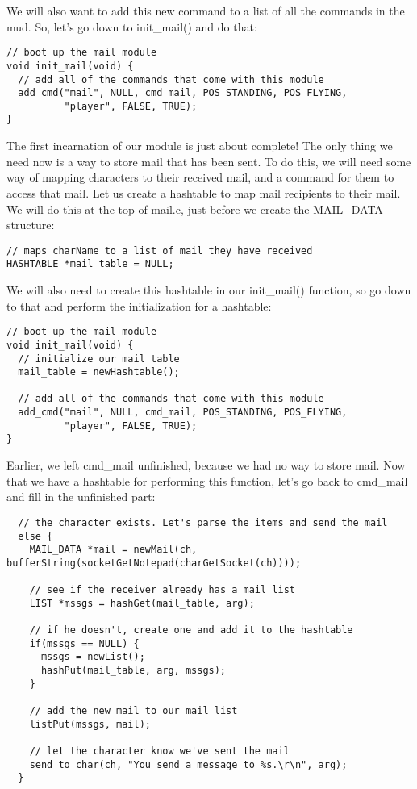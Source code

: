 \documentclass[12pt]{article}
\begin{document}
We will also want to add this new command to a list of all the commands in the mud. So, let's go down to init\_mail() and do that:

{\bf \begin{verbatim}
// boot up the mail module
void init_mail(void) {
  // add all of the commands that come with this module
  add_cmd("mail", NULL, cmd_mail, POS_STANDING, POS_FLYING,
          "player", FALSE, TRUE);
}
\end{verbatim}}

The first incarnation of our module is just about complete! The only thing we
need now is a way to store mail that has been sent. To do this, we will need some way of mapping characters to their received mail, and a command for them to access that mail. Let us create a hashtable to map mail recipients to their mail. We will do this at the top of mail.c, just before we create the MAIL\_DATA structure:

{\bf \begin{verbatim}
// maps charName to a list of mail they have received
HASHTABLE *mail_table = NULL;
\end{verbatim}}

We will also need to create this hashtable in our init\_mail() function, so go down to that and perform the initialization for a hashtable:

{\bf \begin{verbatim}
// boot up the mail module
void init_mail(void) {
  // initialize our mail table
  mail_table = newHashtable();

  // add all of the commands that come with this module
  add_cmd("mail", NULL, cmd_mail, POS_STANDING, POS_FLYING,
          "player", FALSE, TRUE);
}
\end{verbatim}}

Earlier, we left cmd\_mail unfinished, because we had no way to store mail. Now that we have a hashtable for performing this function, let's go back to cmd\_mail and fill in the unfinished part:

{\bf \begin{verbatim}
  // the character exists. Let's parse the items and send the mail
  else {
    MAIL_DATA *mail = newMail(ch, bufferString(socketGetNotepad(charGetSocket(ch))));
    
    // see if the receiver already has a mail list
    LIST *mssgs = hashGet(mail_table, arg);
    
    // if he doesn't, create one and add it to the hashtable
    if(mssgs == NULL) {
      mssgs = newList();
      hashPut(mail_table, arg, mssgs);
    }

    // add the new mail to our mail list
    listPut(mssgs, mail);

    // let the character know we've sent the mail
    send_to_char(ch, "You send a message to %s.\r\n", arg);
  }
\end{verbatim}}
\end{document}

